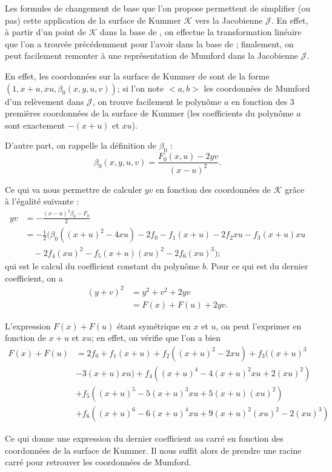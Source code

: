 \documentclass[a4paper,12pt]{article}
\theoremstyle{definition}
\theoremstyle{remark}
\numberwithin{equation}{section}
\begin{document}
Les formules de changement de base que l'on propose permettent de simplifier (ou pas) cette application de la surface de Kummer $\mathcal{K}$ vers la Jacobienne $\mathcal{J}$. En effet, à partir d'un point de $\mathcal{K}$ dans la base de \citet{gaudry}, on effectue la transformation linéaire que l'on a trouvée précédemment pour l'avoir dans la base de \citet{cassels-Flynn}; finalement, on peut facilement remonter à une représentation de Mumford dans la Jacobienne $\mathcal{J}$.

En effet, les coordonnées sur la surface de Kummer de \citet{cassels-Flynn} sont de la forme $(1,x+u,xu,\beta_0(x,y,u,v))$; si l'on note $<a,b>$ les coordonnées de Mumford d'un relèvement dans $\mathcal{J}$, on trouve facilement le polynôme $a$ en fonction des 3 premières coordonnées de la surface de Kummer (les coefficients du polynôme $a$ sont exactement $-(x+u)$ et $xu$).

D'autre part, on rappelle la définition de $\beta_0$ :
$$\beta_0(x,y,u,v) = \frac{F_0(x,u)-2yv}{(x-u)^2}.$$

Ce qui va nous permettre de calculer $yv$ en fonction des coordonnées de $\mathcal{K}$ grâce à l'égalité suivante :
\begin{align*}
yv &= -\frac{(x-u)^2\beta_0 - F_0}{2} \\
   &= -\frac{1}{2}(\beta_0((x+u)^2-4xu) - 2f_0 - f_1(x+u) - 2f_2xu - f_3(x+u)xu \\
   & \quad - 2f_4(xu)^2 - f_5(x+u)(xu)^2 - 2f_6(xu)^3);
\end{align*}
qui est le calcul du coefficient constant du polynôme $b$. Pour ce qui est du dernier coefficient, on a
\begin{align*}
(y+v)^2 &= y^2 + v^2 + 2yv \\
  &= F(x) + F(u) + 2yv.
\end{align*}

L'expression $F(x) + F(u)$ étant symétrique en $x$ et $u$, on peut l'exprimer en fonction de $x+u$ et $xu$; en effet, on vérifie que l'on a bien
\begin{align*}
F(x) + F(u) &= 2f_0 + f_1(x+u)+ f_2((x+u)^2 - 2xu) + f_3((x+u)^3 \\ 
   &- 3(x+u)xu) + f_4((x+u)^4 - 4(x+u)^2xu + 2(xu)^2)   \\
   &+ f_5((x+u)^5 - 5(x+u)^3xu+ 5(x+u)(xu)^2) \\
   &+ f_6((x+u)^6 - 6(x+u)^4xu + 9(x+u)^2(xu)^2 - 2 (xu)^3)
\end{align*}

Ce qui donne une expression du dernier coefficient au carré en fonction des coordonnées de la surface de Kummer. Il nous suffit alors de prendre une racine carré pour retrouver les coordonnées de Mumford.
\end{document}

